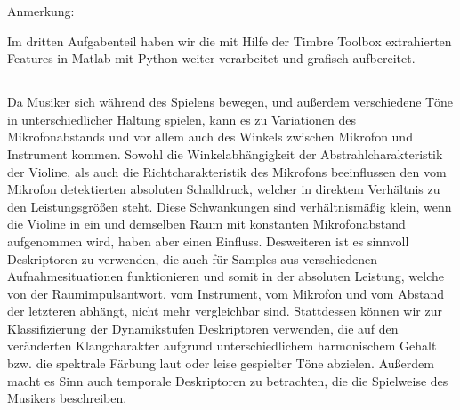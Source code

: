 Anmerkung:

Im dritten Aufgabenteil haben wir die mit Hilfe der Timbre Toolbox extrahierten Features in Matlab mit Python weiter verarbeitet und grafisch aufbereitet.

\subsection{}

Da Musiker sich während des Spielens bewegen, und außerdem verschiedene Töne in unterschiedlicher Haltung spielen, kann es zu Variationen des Mikrofonabstands und vor allem auch des Winkels zwischen Mikrofon und Instrument kommen. 
Sowohl die Winkelabhängigkeit der Abstrahlcharakteristik der Violine, als auch die Richtcharakteristik des Mikrofons beeinflussen den vom Mikrofon detektierten absoluten Schalldruck, welcher in direktem Verhältnis zu den Leistungsgrößen steht. 
Diese Schwankungen sind verhältnismäßig klein, wenn die Violine in ein und demselben Raum mit konstanten Mikrofonabstand aufgenommen wird, haben aber einen Einfluss.
Desweiteren ist es sinnvoll Deskriptoren zu verwenden, die auch für Samples aus verschiedenen Aufnahmesituationen funktionieren und somit in der absoluten Leistung, welche von der Raumimpulsantwort, vom Instrument, vom Mikrofon und vom Abstand der letzteren abhängt, nicht mehr vergleichbar sind.
Stattdessen können wir zur Klassifizierung der Dynamikstufen Deskriptoren verwenden, die auf den veränderten Klangcharakter aufgrund unterschiedlichem harmonischem Gehalt bzw. die spektrale Färbung laut oder leise gespielter Töne abzielen.
Außerdem macht es Sinn auch temporale Deskriptoren zu betrachten, die die Spielweise des Musikers beschreiben.
